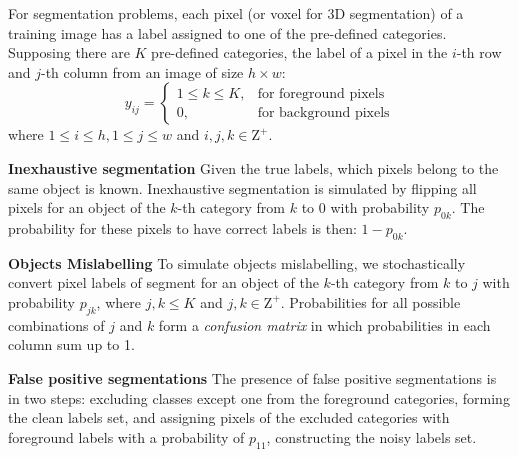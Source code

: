 For segmentation problems, each pixel (or voxel for 3D segmentation) of a training image has a label assigned to one of the pre-defined categories.
Supposing there are $K$ pre-defined categories, the label of a pixel in the $i$-th row and $j$-th column from an image of size $h \times w$:
\[
  y_{ij} =
    \begin{cases}
      1 \leq k \leq K, & \text{for foreground pixels} \\
      0, & \text{for background pixels}
    \end{cases}
\]
where $1 \leq i \leq h, 1 \leq j \leq w$ and $i,j,k \in \mathrm{Z}^+$.


\textbf{Inexhaustive segmentation}
Given the true labels, which pixels belong to the same object is known.
Inexhaustive segmentation is simulated by flipping all pixels for an object of the $k$-th category from $k$ to $0$ with probability $p_{0k}$.
The probability for these pixels to have correct labels is then: $1-p_{0k}$.


\textbf{Objects Mislabelling}
To simulate objects mislabelling, we stochastically convert pixel labels of segment for an object of the $k$-th category from $k$ to $j$ with probability $p_{jk}$, where $j, k \leq K$ and $j,k \in \mathrm{Z}^+$.
Probabilities for all possible combinations of $j$ and $k$ form a \textit{confusion matrix} in which probabilities in each column sum up to 1.

\textbf{False positive segmentations}
The presence of false positive segmentations is in two steps: excluding classes except one from the foreground categories, forming the clean labels set, and assigning pixels of the excluded categories with foreground labels with a probability of $p_{11}$, constructing the noisy labels set.%

